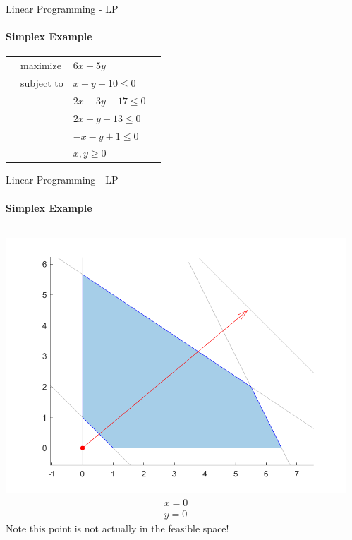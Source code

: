 \documentclass{beamer}
\begin{document}
	\begin{frame}{Linear Programming - LP}
		\framesubtitle{Simplex Example}
		\begin{tabularx}{\textwidth}{X l l X}
			& maximize		& $6x + 5y$		& \\
			& subject to	& $x + y - 10 \leq 0$	& \\
			& 				& $2x + 3y - 17 \leq 0$	& \\
			& 				& $2x + y - 13 \leq 0$ & \\
			& 				& $-x-y + 1 \leq 0$ & \\
			& 				& $x, y \geq 0$ & 
		\end{tabularx}
	\end{frame}	
	
	\begin{frame}{Linear Programming - LP}
		\framesubtitle{Simplex Example}
		\begin{columns}[T]
			\begin{column}{0.33\textwidth}
				\includegraphics[width=\textwidth]{images/slides_ex3_simplex1.png}
				\begin{align*}
					x = 0\\
					y = 0
				\end{align*}
				Note this point is not actually in the feasible space!
			\end{column}
			\begin{column}{0.33\textwidth}

\end{column}
\end{columns}
\end{frame}
\end{document}
